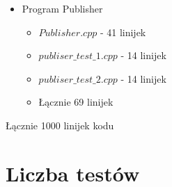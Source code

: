 \documentclass[a4paper,titlepage,11pt,twosides,floatssmall]{mwrep}
\begin{document}
\begin{itemize}
	\item Program Publisher

\begin{itemize}
\item $Publisher.cpp$ - 41 linijek 
\item $publiser\_test\_1.cpp$ - 14 linijek 
\item $publiser\_test\_2.cpp$ - 14 linijek 
\item Łącznie 69 linijek
\end{itemize}

\end{itemize}
Łącznie 1000 linijek kodu

\section{Liczba testów}
\end{document}

